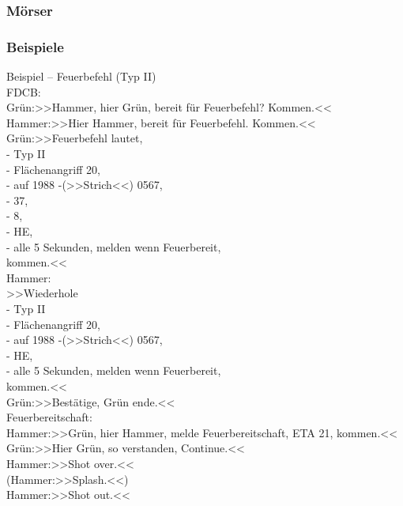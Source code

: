 \subsubsection{Mörser}

\subsubsection{Beispiele}
	Beispiel – Feuerbefehl (Typ II) \\

	FDCB: \\
	 Grün:>>Hammer, hier Grün, bereit für Feuerbefehl? Kommen.<< \\
	 Hammer:>>Hier Hammer, bereit für Feuerbefehl. Kommen.<< \\
	 Grün:>>Feuerbefehl lautet,  \\
	 - Typ II \\
	 - Flächenangriff 20, \\
	 - auf 1988 -(>>Strich<<) 0567, \\
	 - 37, \\
	 - 8, \\
	 - HE, \\
	 - alle 5 Sekunden, melden wenn Feuerbereit, \\
	 kommen.<< \\


	Hammer:   \\
	 >>Wiederhole  \\
	 - Typ II  \\
	 - Flächenangriff 20,  \\
	 - auf 1988 -(>>Strich<<) 0567,  \\
	 - HE,  \\
	 - alle 5 Sekunden, melden wenn Feuerbereit,  \\
	 kommen.<<  \\
	 Grün:>>Bestätige, Grün ende.<<  \\
	 Feuerbereitschaft:  \\
	 Hammer:>>Grün, hier Hammer, melde Feuerbereitschaft, ETA 21, kommen.<<  \\
	 Grün:>>Hier Grün, so verstanden, Continue.<<  \\
	 Hammer:>>Shot over.<<  \\
	 (Hammer:>>Splash.<<)  \\
	 Hammer:>>Shot out.<<  \\


